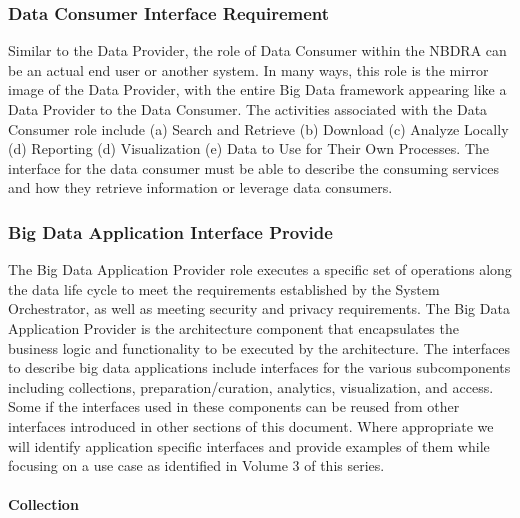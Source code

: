 \documentclass[10pt]{article}
\begin{document}
\subsubsection{Data Consumer Interface Requirement}

Similar to the Data Provider, the role of Data Consumer within the NBDRA can be an actual end user or another system. In many ways, this role is the mirror image of the Data Provider, with the entire Big Data framework appearing like a Data Provider to the Data Consumer. The activities associated with the Data Consumer role include (a) Search and Retrieve (b) Download (c) Analyze Locally (d) Reporting (d) Visualization (e) Data to Use for Their Own Processes. The interface for the data consumer must be able to describe the consuming services and how they retrieve information or leverage data consumers.

\subsubsection{Big Data Application Interface Provide}

The Big Data Application Provider role executes a specific set of operations along the data life cycle to meet the requirements established by the System Orchestrator, as well as meeting security and privacy requirements. The Big Data Application Provider is the architecture component that encapsulates the business logic and functionality to be executed by the architecture. 
The interfaces to describe big data applications include interfaces for the various subcomponents including collections, preparation/curation, analytics, visualization, and access. Some if the interfaces used in these components can be reused from other interfaces introduced in other sections of this document. Where appropriate we will identify application specific interfaces and provide examples of them while focusing on a use case as identified in Volume 3 of this series.

\paragraph{Collection}
\end{document}
